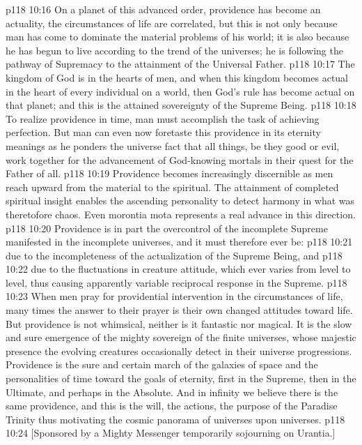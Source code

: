 \vs p118 10:16 \pc On a planet of this advanced order, providence has become an actuality, the circumstances of life are correlated, but this is not only because man has come to dominate the material problems of his world; it is also because he has begun to live according to the trend of the universes; he is following the pathway of Supremacy to the attainment of the Universal Father.
\vs p118 10:17 \pc The kingdom of God is in the hearts of men, and when this kingdom becomes actual in the heart of every individual on a world, then God’s rule has become actual on that planet; and this is the attained sovereignty of the Supreme Being.
\vs p118 10:18 To realize providence in time, man must accomplish the task of achieving perfection. But man can even now foretaste this providence in its eternity meanings as he ponders the universe fact that all things, be they good or evil, work together for the advancement of God\hyp{}knowing mortals in their quest for the Father of all.
\vs p118 10:19 \pc Providence becomes increasingly discernible as men reach upward from the material to the spiritual. The attainment of completed spiritual insight enables the ascending personality to detect harmony in what was theretofore chaos. Even morontia mota represents a real advance in this direction.
\vs p118 10:20 Providence is in part the overcontrol of the incomplete Supreme manifested in the incomplete universes, and it must therefore ever be:
\vs p118 10:21 \bibnobreakspace {} due to the incompleteness of the actualization of the Supreme Being, and
\vs p118 10:22 \bibnobreakspace {} due to the fluctuations in creature attitude, which ever varies from level to level, thus causing apparently variable reciprocal response in the Supreme.
\vs p118 10:23 \pc When men pray for providential intervention in the circumstances of life, many times the answer to their prayer is their own changed attitudes toward life. But providence is not whimsical, neither is it fantastic nor magical. It is the slow and sure emergence of the mighty sovereign of the finite universes, whose majestic presence the evolving creatures occasionally detect in their universe progressions. Providence is the sure and certain march of the galaxies of space and the personalities of time toward the goals of eternity, first in the Supreme, then in the Ultimate, and perhaps in the Absolute. And in infinity we believe there is the same providence, and this is the will, the actions, the purpose of the Paradise Trinity thus motivating the cosmic panorama of universes upon universes.
\vsetoff
\vs p118 10:24 [Sponsored by a Mighty Messenger temporarily sojourning on Urantia.]
\quizlink
